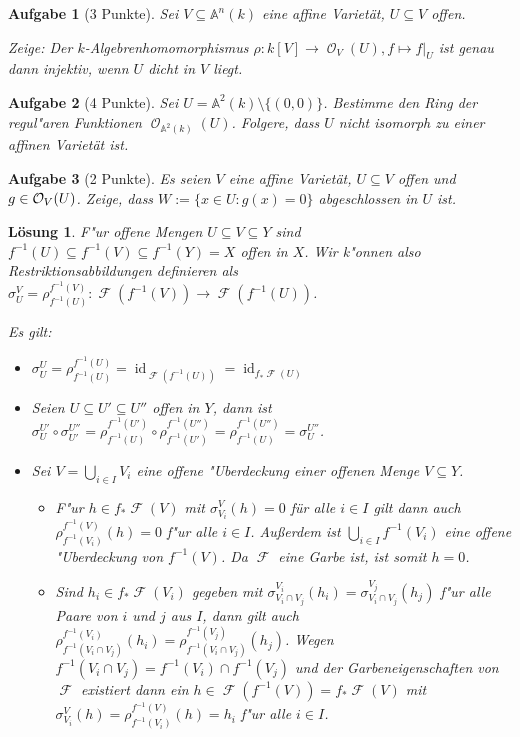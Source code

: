 \documentclass[a4paper, 12pt, numbers=noendperiod, chapterprefix=true]{scrbook}
\theoremstyle{break}
\newtheorem{Aufg}{Aufgabe}
\newtheorem{Loes}{L\"osung}
\theoremstyle{nonumberbreak}
\theoremstyle{nonumberplain}
\DeclareMathOperator{\id}{id}
\newcommand{\A}{\mathbb{A}}
\newcommand{\Affine}{\mathbb{A}} %
\DeclareMathOperator{\Faisceau}{\mathcal{F}} %
\DeclareMathOperator{\Reg}{\mathcal{O}} %
\begin{document}
\begin{Aufg}[3 Punkte]
Sei $V \subseteq \Affine^n(k)$ eine affine Variet\"at, $U \subseteq V$ offen. 

Zeige: Der $k$-Algebrenhomomorphismus $\rho \colon k[V] \to \Reg_V(U), f \mapsto f|_U$ ist genau dann injektiv, wenn $U$ dicht in $V$ liegt.
\end{Aufg}

\begin{Aufg}[4 Punkte]
Sei $U = \Affine^2(k)\setminus \{(0,0)\}$. Bestimme den Ring der regul"aren Funktionen $\Reg_{\Affine^2(k)}(U)$. Folgere, dass $U$ nicht isomorph zu einer affinen Variet\"at ist.
\end{Aufg}

\begin{Aufg}[2 Punkte]
Es seien $V$ eine affine Variet\"at, $U\subseteq V$ offen und $g\in{\cal O}_V(U)$. Zeige, dass $W:= \{x\in U: g(x)=0\}$ abgeschlossen in $U$ ist.
\end{Aufg}

\begin{Loes}
F"ur offene Mengen $U \subseteq V \subseteq Y$ sind $f^{-1}(U) \subseteq f^{-1}(V) \subseteq f^{-1}(Y) = X$ offen in $X$. Wir k"onnen also Restriktionsabbildungen definieren als $\sigma^V_U = \rho^{f^{-1}(V)}_{f^{-1}(U)}: \Faisceau(f^{-1}(V)) \to \Faisceau(f^{-1}(U))$.

Es gilt:
\begin{itemize}
\item
	$\sigma^U _U = \rho^{f^{-1}(U)}_{f^{-1}(U)} = \id_{\Faisceau(f^{-1}(U))} = \id_{f_*\Faisceau(U)}$
\item
	Seien $U \subseteq U' \subseteq U''$ offen in $Y$, dann ist
	$\sigma^{U'}_U \circ \sigma^{U''}_{U'} = \rho^{f^{-1}(U')}_{f^{-1}(U)}	 \circ \rho^{f^{-1}(U'')}_{f^{-1}(U')} = \rho^{f^{-1}(U'')}_{f^{-1}(U)} = \sigma^{U''}_{U}$.
\item
	Sei $V = \bigcup_{i \in I} V_i$ eine offene "Uberdeckung einer offenen Menge $V \subseteq Y$. 
	\begin{itemize}
	\item
		F"ur $h \in f_*\Faisceau(V)$ mit $\sigma^V_{V_i}(h) = 0$ für alle $i \in I$ gilt dann auch $\rho^{f^{-1}(V)}_{f^{-1}(V_i)}(h) = 0$ f"ur alle $i \in I$. Außerdem ist $\bigcup_{i \in I} f^{-1}(V_i)$ eine offene "Uberdeckung von $f^{-1}(V)$. Da $\Faisceau$ eine Garbe ist, ist somit $h = 0$.
	\item
		Sind $h_i \in f_*\Faisceau(V_i)$ gegeben mit $\sigma^{V_i}_{V_i \cap V_j} (h_i) = \sigma^{V_j}_{V_i \cap V_j} (h_j)$ f"ur alle Paare von $i$ und $j$ aus $I$, dann gilt auch $\rho^{f^{-1}(V_i)}_{f^{-1}(V_i \cap V_j)} (h_i) = \rho^{f^{-1}(V_j)}_{f^{-1}(V_i \cap V_j)} (h_j)$. Wegen $f^{-1}(V_i \cap V_j) = f^{-1}(V_i) \cap f^{-1}(V_j)$ und der Garbeneigenschaften von $\Faisceau$ existiert dann ein $h \in \Faisceau(f^{-1}(V))= f_*\Faisceau(V)$ mit $\sigma^V_{V_i}(h) = \rho^{f^{-1}(V)}_{f^{-1}(V_i)}(h) = h_i$ f"ur alle $i\in I$.
\end{itemize}\end{itemize}\end{Loes}
\end{document}
